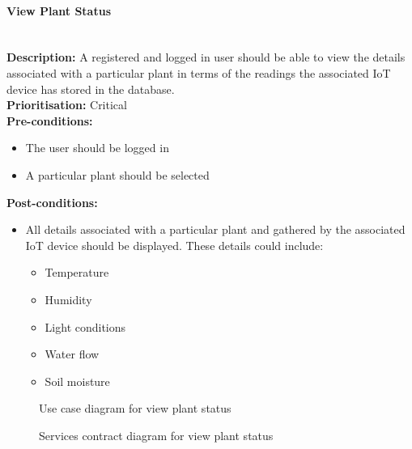 \documentclass{article}
\begin{document}
	\paragraph{View Plant Status}\mbox{}\\
		\textbf{Description:} A registered and logged in user should be able to view the details associated with a particular plant in terms of the readings the associated IoT device has stored in the database.\\
		\textbf{Prioritisation:} Critical\\		
		\textbf{Pre-conditions:}
			\begin{itemize}
				\item The user should be logged in
				\item A particular plant should be selected
			\end{itemize}
		\textbf{Post-conditions:}
			\begin{itemize}
				\item All details associated with a particular plant and gathered by the associated IoT device should be displayed. These details could include:
				\begin{itemize}
					\item Temperature
					\item Humidity
					\item Light conditions
					\item Water flow
					\item Soil moisture
				\end{itemize}
			\end{itemize}

		\begin{figure}[H]
			\caption{Use case diagram for view plant status}
		\end{figure}
		
		\begin{figure}[H]
			\caption{Services contract diagram for view plant status}
		\end{figure}
		
\end{document}
